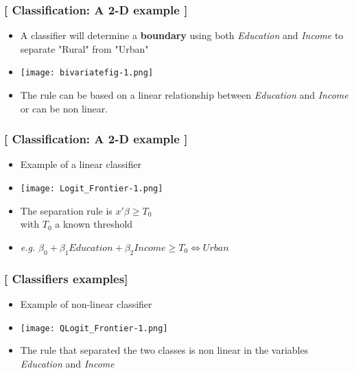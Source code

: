 \documentclass[xcolor=x11names,compress, handhouts]{beamer}
\renewcommand{\(}{\begin{columns}}
\renewcommand{\)}{\end{columns}}
\newcommand{\<}[1]{\begin{column}{#1}}
\renewcommand{\>}{\end{column}}
\begin{document}
\begin{frame} %
\frametitle{\textcolor{brique}{[ Classification:  A 2-D example ]}}
\pause
\begin{itemize}[<+->]
   \item A classifier will determine a\textbf{ boundary} using both \textit{Education}  and \textit{Income} to separate "Rural" from "Urban"
   \item[] \begin{center}\texttt{[image: bivariatefig-1.png]} \end{center}
  \item The rule can be based on a linear relationship between \textit{Education}  and \textit{Income} or can be non linear.
\end{itemize}
\end{frame}


\begin{frame} %
\frametitle{\textcolor{brique}{[ Classification:  A 2-D example ]}}
\pause
\begin{itemize}[<+->]
  \item Example of a linear classifier
  \item[] \begin{center}\texttt{[image: Logit\_Frontier-1.png]} \end{center}
  \item The separation rule is  $ x'\beta \geq T_0$ \\ with $T_0$ a known threshold
  \item[]\textit{e.g.} $\beta_0 + \beta_1 Education + \beta_2 Income \geq T_0  \Leftrightarrow Urban$

\end{itemize}
\end{frame}

\begin{frame} %
\frametitle{\textcolor{brique}{[ Classifiers examples]}}
\pause
\begin{itemize}[<+->]
  \item Example of non-linear classifier
  \item[] \begin{center}\texttt{[image: QLogit\_Frontier-1.png]} \end{center}
  \item The rule that separated the two classes is non linear in the variables \textit{Education}  and \textit{Income}
\end{itemize}
\end{frame}
\end{document}
